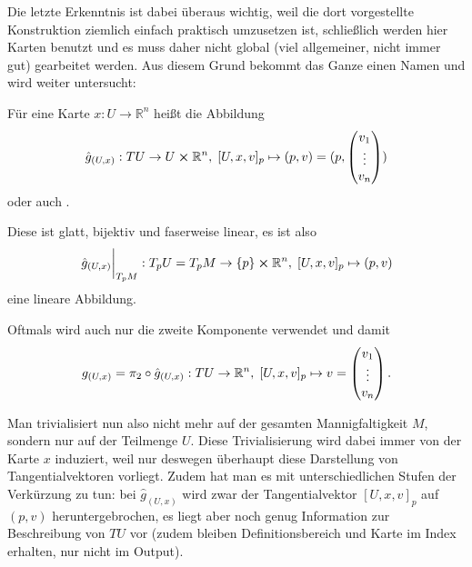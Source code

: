 \documentclass[../H_Analysis_main.tex]{subfiles}
\begin{document}
Die letzte Erkenntnis ist dabei überaus wichtig, weil die dort vorgestellte Konstruktion ziemlich einfach praktisch umzusetzen ist, schließlich werden hier Karten benutzt und es muss daher nicht global (viel allgemeiner, nicht immer gut) gearbeitet werden. Aus diesem Grund bekommt das Ganze einen Namen und wird weiter untersucht:
\begin{defi}
Für eine Karte $x: U \rightarrow \mathbb{R}^n$ heißt die Abbildung
\begin{equation}
\hat{g}_{(U, x)}: TU \rightarrow U \cross \mathbb{R}^n, \; [U, x, v]_p \mapsto (p, v) = (p, \mqty(v_1 \\ \vdots \\ v_n))
\end{equation}
 oder auch .

Diese ist glatt, bijektiv und faserweise linear, es ist also
\begin{equation*}
\eval{\hat{g}_{(U, x)}}_{T_p M}: T_p U = T_p M \rightarrow \qty{p} \cross \mathbb{R}^n, \; [U, x, v]_p \mapsto (p, v)
\end{equation*}
eine lineare Abbildung.

Oftmals wird auch nur die zweite Komponente verwendet und damit
\begin{equation}
g_{(U, x)} = \pi_2 \circ \hat{g}_{(U, x)}: TU \rightarrow \mathbb{R}^n, \; [U, x, v]_p \mapsto v = \mqty(v_1 \\ \vdots \\ v_n) \, .
\end{equation}
\end{defi}

Man trivialisiert nun also nicht mehr auf der gesamten Mannigfaltigkeit $M$, sondern nur auf der Teilmenge $U$. Diese Trivialisierung wird dabei immer von der Karte $x$ induziert, weil nur deswegen überhaupt diese Darstellung von Tangentialvektoren vorliegt. Zudem hat man es mit unterschiedlichen Stufen der Verkürzung zu tun: bei $\hat{g}_{(U, x)}$ wird zwar der Tangentialvektor $[U, x, v]_p$ auf $(p, v)$ heruntergebrochen, es liegt aber noch genug Information zur Beschreibung von $TU$ vor (zudem bleiben Definitionsbereich und Karte im Index erhalten, nur nicht im Output).
\end{document}
